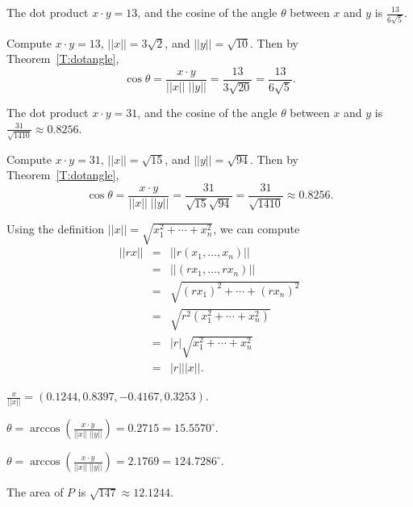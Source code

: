  \ans The dot product $x \cdot y = 13$, and the cosine
of the angle $\theta$ between $x$ and $y$ is $\frac{13}{6\sqrt{5}}$.

\soln Compute $x \cdot y = 13$, $||x|| = 3\sqrt{2}$, and $||y|| = \sqrt{10}$.
Then by Theorem~\ref{T:dotangle},
\[
\cos\theta = \frac{x \cdot y}{||x||\;||y||} = \frac{13}{3\sqrt{20}}
= \frac{13}{6\sqrt{5}}.
\]

 \ans The dot product $x \cdot y = 31$, and the cosine
of the angle $\theta$ between $x$ and $y$ is
$\frac{31}{\sqrt{1410}} \approx 0.8256$.

\soln Compute $x \cdot y = 31$, $||x|| = \sqrt{15}$, and $||y|| = \sqrt{94}$.
Then by Theorem~\ref{T:dotangle},
\[
\cos\theta = \frac{x \cdot y}{||x||\;||y||} = \frac{31}{\sqrt{15}\sqrt{94}}
= \frac{31}{\sqrt{1410}} \approx 0.8256.
\]

 Using the definition $||x|| = \sqrt{x_1^2 + \cdots + x_n^2}$,
we can compute
\[
\begin{array}{rcl}
||rx|| & = & ||r(x_1,\dots,x_n)|| \\
& = & ||(rx_1,\dots,rx_n)|| \\
& = & \sqrt{(rx_1)^2 + \cdots + (rx_n)^2} \\
& = & \sqrt{r^2(x_1^2 + \cdots + x_n^2)} \\
& = & |r|\sqrt{x_1^2 + \cdots + x_n^2} \\
& = & |r| ||x||.
\end{array}
\]


$\frac{x}{||x||} = (0.1244, 0.8397, -0.4167, 0.3253)$.

 $\theta =
\arccos \left(\frac{x \cdot y}{||x||\;||y||}\right) =
0.2715 = 15.5570^\circ$.

 $\theta =
\arccos \left(\frac{x \cdot y}{||x||\;||y||}\right) =
2.1769 = 124.7286^\circ$.

 \ans The area of $P$ is $\sqrt{147} \approx 12.1244$.
